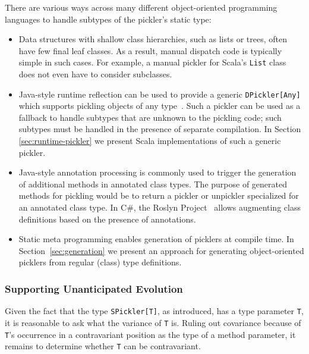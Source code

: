 \documentclass[10pt]{sigplanconf}
\theoremstyle{definition}
\theoremstyle{definition}
\newcommand{\term}[1]{\mbox{\texttt{#1}}}
\begin{document}
There are various ways across many different object-oriented programming
languages to handle subtypes of the pickler's static type:

\begin{itemize}
\item Data structures with shallow class hierarchies, such as lists or trees,
often have few final leaf classes. As a result, manual dispatch code is
typically simple in such cases. For example, a manual pickler for Scala's
\term{List} class does not even have to consider subclasses.

\item Java-style runtime reflection can be used to provide a generic
\term{DPickler[Any]} which supports pickling objects of any
type~\cite{JavaSerialization,Philippsen2000}. Such a pickler can be used as a
fallback to handle subtypes that are unknown to the pickling code; such
subtypes must be handled in the presence of separate compilation. In
Section \ref{sec:runtime-pickler} we present Scala implementations of such a
generic pickler.

\item Java-style annotation processing is commonly used to trigger the
generation of additional methods in annotated class types. The purpose of
generated methods for pickling would be to return a pickler or unpickler
specialized for an annotated class type. In C\#, the Roslyn
Project~\cite{Roslyn} allows augmenting class definitions based on the
presence of annotations.

\item Static meta programming \cite{Burmako2012,Nemerle} enables generation of
picklers at compile time. In Section~\ref{sec:generation} we present an
approach for generating object-oriented picklers from regular (class) type
definitions.
\end{itemize}


\subsubsection{Supporting Unanticipated Evolution}\label{sec:unanticipated}

Given the fact that the type \term{SPickler[T]}, as introduced, has a type
parameter \term{T}, it is reasonable to ask what the variance of \term{T} is. Ruling out
covariance because of \term{T}'s occurrence in a contravariant position as the type
of a method parameter, it remains to determine whether \term{T} can be
contravariant.
\end{document}

